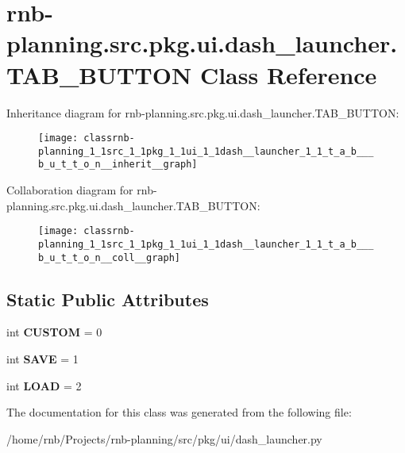 \hypertarget{classrnb-planning_1_1src_1_1pkg_1_1ui_1_1dash__launcher_1_1_t_a_b___b_u_t_t_o_n}{}\section{rnb-\/planning.src.\+pkg.\+ui.\+dash\+\_\+launcher.\+T\+A\+B\+\_\+\+B\+U\+T\+T\+ON Class Reference}
\label{classrnb-planning_1_1src_1_1pkg_1_1ui_1_1dash__launcher_1_1_t_a_b___b_u_t_t_o_n}


Inheritance diagram for rnb-\/planning.src.\+pkg.\+ui.\+dash\+\_\+launcher.\+T\+A\+B\+\_\+\+B\+U\+T\+T\+ON\+:\nopagebreak
\begin{figure}[H]
\begin{center}
\leavevmode
\texttt{[image: classrnb-planning\_1\_1src\_1\_1pkg\_1\_1ui\_1\_1dash\_\_launcher\_1\_1\_t\_a\_b\_\_\_b\_u\_t\_t\_o\_n\_\_inherit\_\_graph]}
\end{center}
\end{figure}


Collaboration diagram for rnb-\/planning.src.\+pkg.\+ui.\+dash\+\_\+launcher.\+T\+A\+B\+\_\+\+B\+U\+T\+T\+ON\+:\nopagebreak
\begin{figure}[H]
\begin{center}
\leavevmode
\texttt{[image: classrnb-planning\_1\_1src\_1\_1pkg\_1\_1ui\_1\_1dash\_\_launcher\_1\_1\_t\_a\_b\_\_\_b\_u\_t\_t\_o\_n\_\_coll\_\_graph]}
\end{center}
\end{figure}
\subsection*{Static Public Attributes}
\begin{DoxyCompactItemize}
\item 
\mbox{\label{classrnb-planning_1_1src_1_1pkg_1_1ui_1_1dash__launcher_1_1_t_a_b___b_u_t_t_o_n_a4889ff9630112b8357b353602e4c5059}} 
int {\bfseries C\+U\+S\+T\+OM} = 0
\item 
\mbox{\label{classrnb-planning_1_1src_1_1pkg_1_1ui_1_1dash__launcher_1_1_t_a_b___b_u_t_t_o_n_a8ea89621dfd606252326e1beff31adaa}} 
int {\bfseries S\+A\+VE} = 1
\item 
\mbox{\label{classrnb-planning_1_1src_1_1pkg_1_1ui_1_1dash__launcher_1_1_t_a_b___b_u_t_t_o_n_a62c823a9bd4ec7a004a624658b29d9f2}} 
int {\bfseries L\+O\+AD} = 2
\end{DoxyCompactItemize}


The documentation for this class was generated from the following file\+:\begin{DoxyCompactItemize}
\item 
/home/rnb/\+Projects/rnb-\/planning/src/pkg/ui/dash\+\_\+launcher.\+py\end{DoxyCompactItemize}
